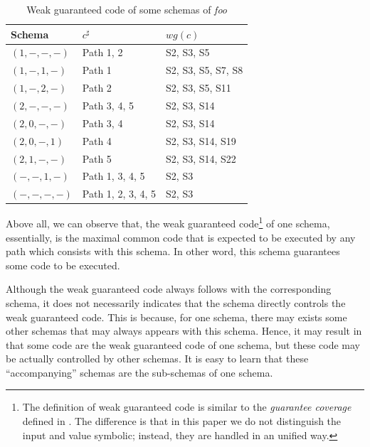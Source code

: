 \documentclass{sig-alternate-05-2015}
\begin{document}
\begin{table}[ht]
\caption{Weak guaranteed code of some schemas of \emph{foo}}
\label{weg-foo}
\center
\begin{tabular}{lll}
 \hline
\bfseries Schema & \bfseries $c^{\sharp}$ & \bfseries $wg(c)$\\  \hline
 $(1, -, -, -)$ & Path 1, 2& S2, S3, S5 \\
 $(1, -, 1, -)$ & Path 1 & S2, S3, S5, S7, S8\\
 $(1, -, 2, -)$ & Path 2 & S2, S3, S5, S11\\
 $(2, -, -, -)$ & Path 3, 4, 5& S2, S3, S14\\
 $(2, 0, -, -)$ & Path 3, 4& S2, S3, S14\\
 $(2, 0, -, 1)$ & Path 4& S2, S3, S14, S19\\
 $(2, 1, -, -)$ & Path 5& S2, S3, S14, S22\\
 $(-, -, 1, -)$ & Path 1, 3, 4, 5 & S2, S3 \\
 $(-, -, -, -)$ & Path 1, 2, 3, 4, 5 & S2, S3 \\
 \hline
\end{tabular}
\end{table}

Above all, we can observe that, the weak guaranteed code\footnote{The definition of weak guaranteed code is similar to the \emph{guarantee coverage} defined in \cite{reisner2010using}. The difference is that in this paper we do not distinguish the input and value symbolic; instead, they are handled in an unified way.} of one schema, essentially, is the maximal common code that is expected to be executed by any path which consists with this schema. In other word, this schema guarantees some code to be executed.





Although the weak guaranteed code always follows with the corresponding schema, it does not necessarily indicates that the schema directly controls the weak guaranteed code. This is because, for one schema, there may exists some other schemas that may always appears with this schema. Hence, it may result in that some code are the weak guaranteed code of one schema, but these code may be actually controlled by other schemas. It is easy to learn that these ``accompanying'' schemas are the sub-schemas of one schema.
\end{document}
